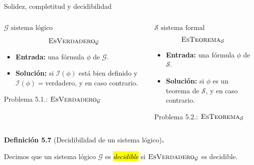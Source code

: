 \documentclass[10pt,xcolor=dvipsnames,aspectratio=169,spanish]{beamer}
\makeatletter
\let\HL\hl
\renewcommand\hl{%
  \let\set@color\beamerorig@set@color
  \let\reset@color\beamerorig@reset@color
  \HL}
\newcommand{\hle}[1]{\hl{\emph{#1}}}
\newcommand{\palabra}[1]{\texttt{\textquotesingle{}{#1}\textquotesingle{}}}
\makeatother
\begin{document}
\begin{frame}{Solidez, completitud y decidibilidad}

\begin{columns}
\begin{column}{0.5\textwidth}
\begin{center}
    $\mathcal{G} \text{ sistema lógico}$
\end{center}

\begin{framed}
$$\text{\textsc{EsVerdadero}}_\mathcal{G}$$

\begin{itemize}
    \item \textbf{Entrada:} una fórmula $\phi$ de $\mathcal{G}$.
    \item \textbf{Solución:} \palabra{sí} si $\mathcal{I}(\phi)$ está bien definido y $\mathcal{I}(\phi)=\text{verdadero}$, y \palabra{no} en caso contrario.
\end{itemize}
\end{framed}
\begin{center}
{\small Problema 5.1.: $\text{\textsc{EsVerdadero}}_\mathcal{G}$}
\end{center}
\end{column}
\begin{column}{0.5\textwidth}
\begin{center}
    $\mathcal{S} \text{ sistema formal}$
\end{center}

\begin{framed}
$$\text{\textsc{EsTeorema}}_\mathcal{S}$$

\begin{itemize}
    \item \textbf{Entrada:} una fórmula $\phi$ de $\mathcal{S}$.
    \item \textbf{Solución:} \palabra{sí} si $\phi$ es un teorema de $\mathcal{S}$, y \palabra{no} en caso contrario.
\end{itemize}
\end{framed}
\begin{center}
{\small Problema 5.2.: $\text{\textsc{EsTeorema}}_\mathcal{S}$}
\end{center}
\end{column}
\end{columns}

\vspace{5mm}
\textbf{Definición 5.7} (Decidibilidad de un sistema lógico)\textbf{.}

Decimos que un sistema lógico $\mathcal{G}$ es \hle{decidible} si $\text{\textsc{EsVerdadero}}_\mathcal{G}$ es decidible.
\vspace{10mm}
\end{frame}
\end{document}
